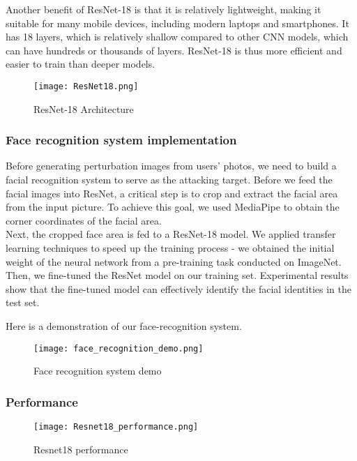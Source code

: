 Another benefit of ResNet-18 is that it is relatively lightweight, making it suitable for many mobile devices, including modern laptops and smartphones. It has 18 layers, which is relatively shallow compared to other CNN models, which can have hundreds or thousands of layers. ResNet-18 is thus more efficient and easier to train than deeper models.

\begin{figure}[h]
\centering
\texttt{[image: ResNet18.png]}
\caption{ResNet-18 Architecture}
\label{fig:resnet18}
\end{figure}

\subsubsection{Face recognition system implementation}

Before generating perturbation images from users’ photos, we need to build a facial recognition system to serve as the attacking target. Before we feed the facial images into ResNet, a critical step is to crop and extract the facial area from the input picture. To achieve this goal, we used MediaPipe to obtain the corner coordinates of the facial area.\\

Next, the cropped face area is fed to a ResNet-18 model. We applied transfer learning techniques to speed up the training process - we obtained the initial weight of the neural network from a pre-training task conducted on ImageNet. Then, we fine-tuned the ResNet model on our training set. Experimental results show that the fine-tuned model can effectively identify the facial identities in the test set. 


Here is a demonstration of our face-recognition system.

\begin{figure}[h]
    \centering
    \texttt{[image: face\_recognition\_demo.png]}
    \caption{Face recognition system demo}
    \label{fig:face-recognition-demo}
    \end{figure}

\subsubsection{Performance}

\begin{figure}[h]
    \centering
    \texttt{[image: Resnet18\_performance.png]}
    \caption{Resnet18 performance}
    \label{fig:resnet18_performance}
\end{figure}

